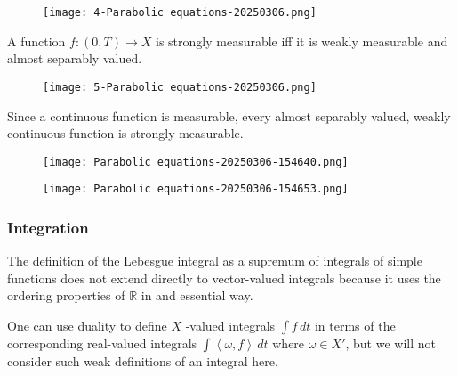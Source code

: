 \begin{definition}
\begin{figure}[H]
\centering
\texttt{[image: 4-Parabolic equations-20250306.png]}
\label{}
\end{figure}
\end{definition}
\begin{theorem}
A function $\displaystyle f:(0,T)\to X$ is strongly measurable iff it is weakly measurable and almost separably valued.
\end{theorem}
\begin{definition}
\begin{figure}[H]
\centering
\texttt{[image: 5-Parabolic equations-20250306.png]}
\label{}
\end{figure}
\end{definition}
Since a continuous function is measurable, every almost separably valued, weakly continuous function is strongly measurable.

\begin{example}
\begin{figure}[H]
\centering
\texttt{[image: Parabolic equations-20250306-154640.png]}
\label{}
\end{figure}
\end{example}
\begin{example}
\begin{figure}[H]
\centering
\texttt{[image: Parabolic equations-20250306-154653.png]}
\label{}
\end{figure}
\end{example}
\subsubsection{Integration}

The definition of the Lebesgue integral as a supremum of integrals of simple functions does not extend directly to vector-valued integrals because it uses the ordering properties of $\mathbb{R}$ in and essential way.

One can use duality to define $X$ -valued integrals $\int f\,dt$ in terms of the corresponding real-valued integrals $\int\left< \omega,f \right>\, dt$ where $\omega\in X'$, but we will not consider such weak definitions of an integral here.

